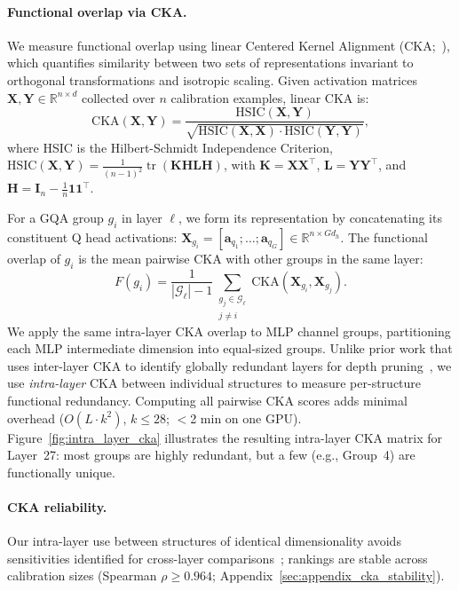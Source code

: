 \paragraph{Functional overlap via CKA.}
We measure functional overlap using linear Centered Kernel Alignment (CKA;~\citealp{kornblith2019cka}), which quantifies similarity between two sets of representations invariant to orthogonal transformations and isotropic scaling.
Given activation matrices $\mathbf{X}, \mathbf{Y} \in \mathbb{R}^{n \times d}$ collected over $n$ calibration examples, linear CKA is:
\begin{equation}
    \text{CKA}(\mathbf{X}, \mathbf{Y}) = \frac{\text{HSIC}(\mathbf{X}, \mathbf{Y})}{\sqrt{\text{HSIC}(\mathbf{X}, \mathbf{X}) \cdot \text{HSIC}(\mathbf{Y}, \mathbf{Y})}},
    \label{eq:cka}
\end{equation}
where HSIC is the Hilbert-Schmidt Independence Criterion, $\text{HSIC}(\mathbf{X}, \mathbf{Y}) = \frac{1}{(n-1)^2} \operatorname{tr}(\mathbf{K} \mathbf{H} \mathbf{L} \mathbf{H})$, with $\mathbf{K} = \mathbf{X}\mathbf{X}^\top$, $\mathbf{L} = \mathbf{Y}\mathbf{Y}^\top$, and $\mathbf{H} = \mathbf{I}_n - \frac{1}{n}\mathbf{1}\mathbf{1}^\top$.

For a GQA group $g_i$ in layer $\ell$, we form its representation by concatenating its constituent Q head activations: $\mathbf{X}_{g_i} = [\mathbf{a}_{q_1}; \ldots; \mathbf{a}_{q_G}] \in \mathbb{R}^{n \times Gd_h}$.
The functional overlap of $g_i$ is the mean pairwise CKA with other groups in the same layer:
\begin{equation}
    F(g_i) = \frac{1}{|\mathcal{G}_\ell| - 1} \sum_{\substack{g_j \in \mathcal{G}_\ell \\ j \neq i}} \text{CKA}(\mathbf{X}_{g_i}, \mathbf{X}_{g_j}).
    \label{eq:overlap}
\end{equation}
We apply the same intra-layer CKA overlap to MLP channel groups, partitioning each MLP intermediate dimension into equal-sized groups.
Unlike prior work that uses inter-layer CKA to identify globally redundant layers for depth pruning~\citep{mpruner2024,lachance2022cka}, we use \emph{intra-layer} CKA between individual structures to measure per-structure functional redundancy.
Computing all pairwise CKA scores adds minimal overhead ($O(L \cdot k^2)$, $k \le 28$; $<$2 min on one GPU).
Figure~\ref{fig:intra_layer_cka} illustrates the resulting intra-layer CKA matrix for Layer~27: most groups are highly redundant, but a few (e.g., Group~4) are functionally unique.

\paragraph{CKA reliability.}
Our intra-layer use between structures of identical dimensionality avoids sensitivities identified for cross-layer comparisons~\citep{davari2023cka,klabunde_similarity_survey_2023}; rankings are stable across calibration sizes (Spearman $\rho \geq 0.964$; Appendix~\ref{sec:appendix_cka_stability}).

